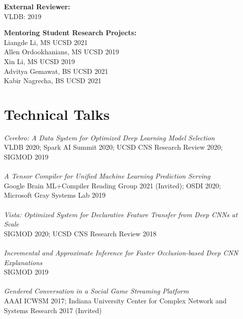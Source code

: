 \documentclass[margin]{res}
\begin{document}
\begin{resume}
\textbf{External Reviewer:}\\
VLDB: 2019

\textbf{Mentoring Student Research Projects:}\\
Liangde Li, MS UCSD 2021\\
Allen Ordookhanians, MS UCSD 2019\\
Xin Li, MS UCSD 2019\\

\vspace{-5mm}
Advitya Gemawat, BS UCSD 2021\\
Kabir Nagrecha, BS UCSD 2021


\section{Technical Talks}
\textit{Cerebro: A Data System for Optimized Deep Learning Model Selection}\\ VLDB 2020; Spark AI Summit 2020; UCSD CNS Research Review 2020; SIGMOD 2019\\\\
\textit{A Tensor Compiler for Unified Machine Learning Prediction Serving}\\ Google Brain ML+Compiler Reading Group 2021 (Invited); OSDI 2020; Microsoft Gray Systems Lab 2019\\\\
\textit{Vista: Optimized System for Declarative Feature Transfer from Deep CNNs at Scale}\\ SIGMOD 2020; UCSD CNS Research Review 2018\\\\
\textit{Incremental and Approximate Inference for Faster Occlusion-based Deep CNN Explanations}\\ SIGMOD 2019\\\\
\textit{Gendered Conversation in a Social Game Streaming Platform}\\ AAAI ICWSM 2017; Indiana University Center for Complex Network and Systems Research 2017 (Invited) \\\\

\end{resume}
\end{document}

